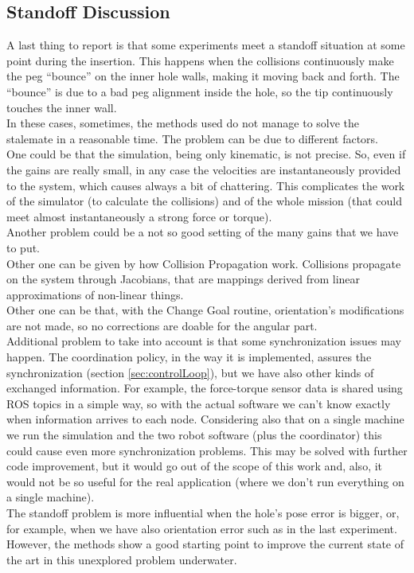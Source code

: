 \subsection{Standoff Discussion}
A last thing to report is that some experiments meet a standoff situation at some point during the insertion. This happens when the collisions continuously make the peg \enquote{bounce} on the inner hole walls, making it moving back and forth. The \enquote{bounce} is due to a bad peg alignment inside the hole, so the tip continuously touches the inner wall.\\

In these cases, sometimes, the methods used do not manage to solve the stalemate in a reasonable time. The problem can be due to different factors.\\
One could be that the simulation, being only kinematic, is not precise. So, even if the gains are really small, in any case the velocities are instantaneously provided to the system, which causes always a bit of chattering. This complicates the work of the simulator (to calculate the collisions) and of the whole mission (that could meet almost instantaneously a strong force or torque).\\
Another problem could be a not so good setting of the many gains that we have to put.\\ Other one can be given by how Collision Propagation work. Collisions propagate on the system through Jacobians, that are mappings derived from linear approximations of non-linear things.\\ 
Other one can be that, with the Change Goal routine, orientation's modifications are not made, so no corrections are doable for the angular part.\\
Additional problem to take into account is that some synchronization issues may happen. The coordination policy, in the way it is implemented, assures the synchronization (section \ref{sec:controlLoop}), but we have also other kinds of exchanged information. For example, the force-torque sensor data is shared using ROS topics in a simple way, so with the actual software we can't know exactly when information arrives to each node. Considering also that on a single machine we run the simulation and the two robot software (plus the coordinator) this could cause even more synchronization problems. This may be solved with further code improvement, but it would go out of the scope of this work and, also, it would not be so useful for the real application (where we don't run everything on a single machine).\\

The standoff problem is more influential when the hole's pose error is bigger, or, for example, when we have also orientation error such as in the last experiment. However, the methods show a good starting point to improve the current state of the art in this unexplored problem underwater.
